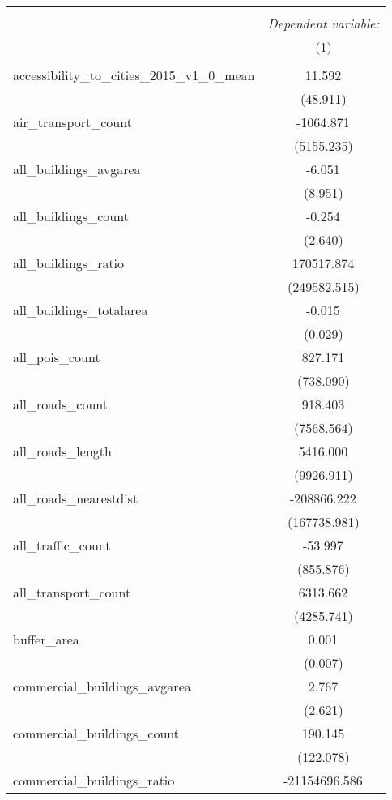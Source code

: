 \begin{table}[!htbp] \centering
\begin{tabular}{@{\extracolsep{5pt}}lc}
\\[-1.8ex]\hline
\hline \\[-1.8ex]
& \multicolumn{1}{c}{\textit{Dependent variable:}} \
\cr \cline{1-2}
\\[-1.8ex] & (1) \\
\hline \\[-1.8ex]
 accessibility_to_cities_2015_v1_0_mean & 11.592$^{}$ \\
  & (48.911) \\
 air_transport_count & -1064.871$^{}$ \\
  & (5155.235) \\
 all_buildings_avgarea & -6.051$^{}$ \\
  & (8.951) \\
 all_buildings_count & -0.254$^{}$ \\
  & (2.640) \\
 all_buildings_ratio & 170517.874$^{}$ \\
  & (249582.515) \\
 all_buildings_totalarea & -0.015$^{}$ \\
  & (0.029) \\
 all_pois_count & 827.171$^{}$ \\
  & (738.090) \\
 all_roads_count & 918.403$^{}$ \\
  & (7568.564) \\
 all_roads_length & 5416.000$^{}$ \\
  & (9926.911) \\
 all_roads_nearestdist & -208866.222$^{}$ \\
  & (167738.981) \\
 all_traffic_count & -53.997$^{}$ \\
  & (855.876) \\
 all_transport_count & 6313.662$^{}$ \\
  & (4285.741) \\
 buffer_area & 0.001$^{}$ \\
  & (0.007) \\
 commercial_buildings_avgarea & 2.767$^{}$ \\
  & (2.621) \\
 commercial_buildings_count & 190.145$^{}$ \\
  & (122.078) \\
 commercial_buildings_ratio & -21154696.586$^{}$ \\

\end{tabular}
\end{table}
